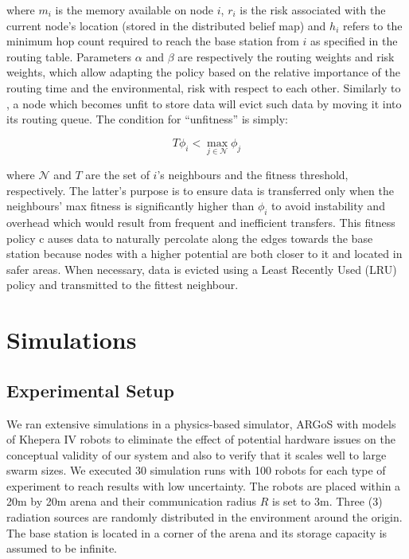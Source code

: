 \documentclass[sigconf]{aamas}
\begin{document}
 where $m_i$ is the memory available on node $i$, $r_i$ is the risk
 associated with the current node's location (stored in the
 distributed belief map) and $h_i$ refers to the minimum hop count
 required to reach the base station from $i$ as specified in the
 routing table. Parameters $\alpha$ and $\beta$ are respectively the routing weights and 
 risk weights, which allow adapting the policy based on the relative importance of the 
 routing time and the environmental, risk with respect to each other. Similarly to 
 \cite{majcherczykSwarmmesh2020}, a node  which becomes unfit to store data will evict such 
 data by moving it into its routing queue. The condition for ``unfitness'' is simply:

\begin{equation}
    T\phi_i < \max_{j \in \mathcal{N}} \phi_j
\end{equation}

where $\mathcal{N}$ and $T$ are the set of $i$'s neighbours and the fitness threshold, 
respectively. The latter's purpose is to ensure data is transferred only when the 
neighbours' max fitness is significantly higher than $\phi_i$ to avoid instability and 
overhead which would result from frequent and inefficient transfers. This fitness policy  c
auses data to naturally percolate along the edges towards the base station because nodes 
with a higher potential are both closer to it and
located in safer areas. When necessary, data is evicted using a Least Recently Used (LRU) policy and transmitted to the fittest neighbour.


\section{Simulations}
\label{Simulations}

\subsection{Experimental Setup}
We ran extensive simulations in a physics-based simulator, ARGoS
\cite{Pinciroli:SI2012} with models of Khepera IV
\cite{kteam2021kheperaiv} robots to eliminate the effect of potential
hardware issues on the conceptual validity of our system and also to
verify that it scales well to large swarm sizes. We executed 30 simulation
runs with 100 robots for each type of experiment to reach results
with low uncertainty. The robots are placed within a 20m by 20m arena and their communication radius $R$ is set to 3m. Three (3) radiation sources are randomly distributed in the environment around the origin. The base station is located in a corner of the arena and its storage capacity is assumed to be infinite. 
\end{document}
